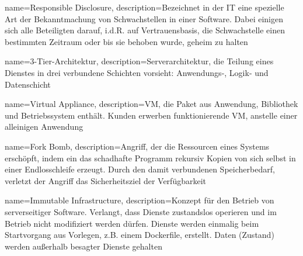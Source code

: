{%
  name={Responsible Disclosure},
  description={Bezeichnet in der IT eine spezielle Art der Bekanntmachung von Schwachstellen in einer Software. Dabei einigen sich alle Beteiligten darauf, i.d.R. auf Vertrauensbasis, die Schwachstelle einen bestimmten Zeitraum oder bis sie behoben wurde, geheim zu halten}
}

{%
  name={3-Tier-Architektur},
  description={Serverarchitektur, die Teilung eines Dienstes in drei verbundene Schichten vorsieht: Anwendungs-, Logik- und Datenschicht}
}

{%
  name={Virtual Appliance},
  description={VM, die Paket aus Anwendung, Bibliothek und Betriebssystem enthält. Kunden erwerben funktionierende VM, anstelle einer alleinigen Anwendung \cite[S.672f.]{tanenbaumOS}}
}

{%
  name={Fork Bomb},
  description={Angriff, der die Ressourcen eines Systems erschöpft, indem ein das schadhafte Programm rekursiv Kopien von sich selbst in einer Endlosschleife erzeugt. Durch den damit verbundenen Speicherbedarf, verletzt der Angriff das Sicherheitsziel der Verfügbarkeit}
}

{%
  name={Immutable Infrastructure},
  description={Konzept für den Betrieb von serverseitiger Software. Verlangt, dass Dienste zustandslos operieren und im Betrieb nicht modifiziert werden dürfen. Dienste werden einmalig beim Startvorgang aus Vorlegen, z.B. einem Dockerfile, erstellt. Daten (Zustand) werden außerhalb besagter Dienste gehalten \cite{unikernelMeetsDocker}\cite{immutableInfrastructure}}
}

